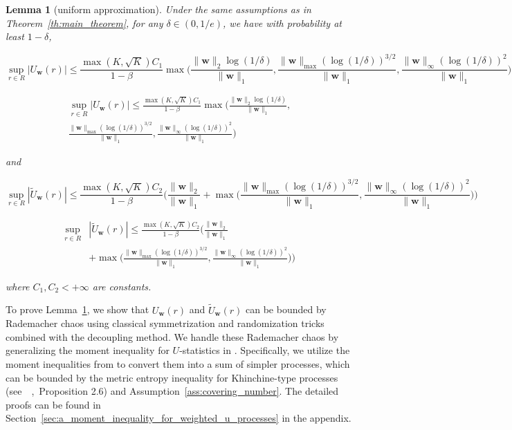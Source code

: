 \documentclass[letterpaper]{article} %
\def\DoubleColumn{}
\def\DoubleColumnEnd{}
\def\SingleColumn{}
\def\SingleColumnEnd{}
\newtheorem{lemma}{Lemma}
\newcommand{\weight}{\mathbf{w}}
\newcommand{\normo}[1]{\|#1\|_1}
\newcommand{\complexbound}{\beta}
\newcommand{\citep}[3]{(#1\ \citeauthor{#3}\ \citeyear{#3},\ #2)}
\begin{document}

\begin{lemma}[uniform approximation]
    \label{le:uniform_approximation}
    Under the same assumptions as in Theorem~\ref{th:main_theorem}, for any $\delta\in (0,1/e)$, we have with probability at least $1-\delta$,
    \SingleColumn
    \[\sup_{r\in R}|U_\weight{}(r)|\le \frac{\max(K,\sqrt{K})C_1}{1-\complexbound{}}\max\Big(\frac{\|\weight{}\|_2\log(1/\delta)}{\normo{\weight{}}},\frac{\|\weight{}\|_{\max}(\log(1/\delta))^{3/2}}{\normo{\weight{}}}, \frac{\|\weight{}\|_\infty(\log(1/\delta))^2}{\normo{\weight{}}}\Big)\]
    \SingleColumnEnd
    \DoubleColumn
    \begin{align*}
        \sup_{r\in R}|U_\weight{}(r)|\le \frac{\max(K,\sqrt{K})C_1}{1-\complexbound{}}\max\Big(\frac{\|\weight{}\|_2\log(1/\delta)}{\normo{\weight{}}},\\
        \frac{\|\weight{}\|_{\max}(\log(1/\delta))^{3/2}}{\normo{\weight{}}}, \frac{\|\weight{}\|_\infty(\log(1/\delta))^2}{\normo{\weight{}}}\Big)
    \end{align*}
    \DoubleColumnEnd
    and
    \SingleColumn
    \[\sup_{r\in R}|\widetilde{U}_\weight{}(r)|\le \frac{\max(K,\sqrt{K})C_2}{1-\complexbound{}}\bigg(\frac{\|\weight{}\|_2}{\normo{\weight{}}}+\max\Big(\frac{\|\weight{}\|_{\max}(\log(1/\delta))^{3/2}}{\normo{\weight{}}},\frac{\|\weight{}\|_\infty(\log(1/\delta))^2}{\normo{\weight{}}}\Big)\bigg)\]
    \SingleColumnEnd
    \DoubleColumn
    \begin{align*}
        \sup_{r\in R}&|\widetilde{U}_\weight{}(r)|\le \frac{\max(K,\sqrt{K})C_2}{1-\complexbound{}}\bigg(\frac{\|\weight{}\|_2}{\normo{\weight{}}}\\
        &+\max\Big(\frac{\|\weight{}\|_{\max}(\log(1/\delta))^{3/2}}{\normo{\weight{}}},\frac{\|\weight{}\|_\infty(\log(1/\delta))^2}{\normo{\weight{}}}\Big)\bigg)
    \end{align*}
    \DoubleColumnEnd
    where $C_1,C_2 < +\infty$ are constants.
\end{lemma}

To prove Lemma~\ref{le:uniform_approximation}, we show that $U_\weight{}(r)$ and $\widetilde{U}_\weight{}(r)$ can be bounded by Rademacher chaos using classical symmetrization and randomization tricks combined with the decoupling method. We handle these Rademacher chaos by generalizing the moment inequality for $U$-statistics in \cite{clemenccon2008ranking}. 
Specifically, we utilize the moment inequalities from \cite{Boucheron2005} to convert them into a sum of simpler processes, which can be bounded by the metric entropy inequality for Khinchine-type processes \citep{see}{Proposition 2.6}{Dembo1994} and Assumption~\ref{ass:covering_number}. The detailed proofs can be found in Section~\ref{sec:a_moment_inequality_for_weighted_u_processes} in the appendix.
\end{document}
